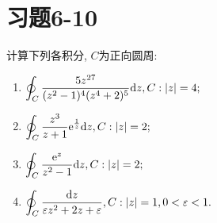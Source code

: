 \section{习题6-10}

\begin{yyEx}
	计算下列各积分, $C$为正向圆周:
	\begin{enumerate}
		\item $\begin{lgathered}
			\oint_C \frac{5z^{27}}{(z^2-1)^4(z^4+2)^5}\mathrm{d}z,C:\abs{z} = 4;
		\end{lgathered}$
		\item $\begin{lgathered}
		\oint_C \frac{z^3}{z+1}\mathrm{e}^{\frac{1}{z}} \mathrm{d}z,C:\abs{z} = 2;
		\end{lgathered}$
		\item $\begin{lgathered}
		\oint_C \frac{\mathrm{e}^z}{z^2-1}\mathrm{d}z,C:\abs{z} = 2;
		\end{lgathered}$
		\item $\begin{lgathered}
		\oint_C \frac{\mathrm{d}z}{\varepsilon z^2+2z+\varepsilon},C:\abs{z} = 1,0<\varepsilon<1.
		\end{lgathered}$
	\end{enumerate}
\end{yyEx}

